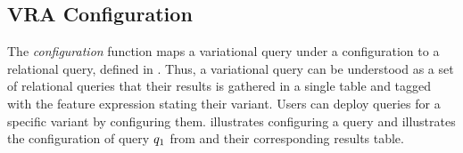 \subsection{VRA Configuration}
\label{sec:vraconf}


%

%
The \emph{configuration} function maps a variational query under
a configuration
to a relational query, defined in . Thus, a variational query 
can be understood as a set of relational queries that their results is gathered
in a single table and tagged with the feature expression stating their variant.
%
Users can deploy queries for a specific variant by configuring 
them.
 illustrates configuring a query
and  illustrates the configuration of query $\vQ_1$ from  and their corresponding results table.



